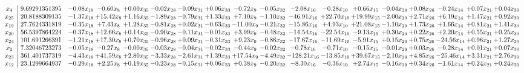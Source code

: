 \documentclass[9pt]{article}
\begin{document}
 \[\begin{array}{c| c c@{\hskip 2pt} c@{\hskip 2pt} c@{\hskip 2pt} c@{\hskip 2pt} c@{\hskip 2pt} c@{\hskip 2pt} c@{\hskip 2pt} c@{\hskip 2pt} c@{\hskip 2pt} c@{\hskip 2pt} c@{\hskip 2pt} c@{\hskip 2pt} c@{\hskip 2pt} c@{\hskip 2pt} c@{\hskip 2pt} c@{\hskip 2pt} }
 x_{4}   &  9.69291351395 & -0.08 x_{18} & -0.60 x_{8} & +  0.00 x_{35} & -0.02 x_{28} & -0.09 x_{31} & +  0.06 x_{33} & -0.72 x_{9} & -0.05 x_{32} & -2.08 x_{16} & -0.28 x_{10} & +  0.66 x_{15} & -0.04 x_{29} & +  0.08 x_{26} & -0.24 x_{14} & +  0.07 x_{21} & +  0.04 x_{30}\\
 x_{25}   &  20.8188309135 & -1.37 x_{18} & + 15.42 x_{8} & +  1.16 x_{35} & -1.89 x_{28} & -0.79 x_{31} & +  1.33 x_{33} & +  7.10 x_{9} & -1.10 x_{32} & -46.91 x_{16} & + 22.70 x_{10} & + 19.99 x_{15} & -2.00 x_{29} & +  2.71 x_{26} & +  6.19 x_{14} & +  1.47 x_{21} & +  0.92 x_{30}\\
 x_{19}   &  27.7624331819 & -0.35 x_{18} & +  7.43 x_{8} & +  1.28 x_{35} & -0.81 x_{28} & +  0.02 x_{31} & -0.63 x_{33} & -11.00 x_{9} & -0.21 x_{32} & -15.86 x_{16} & +  4.93 x_{10} & + 21.08 x_{15} & -1.10 x_{29} & +  1.73 x_{26} & +  1.66 x_{14} & +  0.81 x_{21} & +  1.41 x_{30}\\
 x_{20}   &  56.5397864224 & -0.37 x_{18} & + 12.66 x_{8} & +  0.14 x_{35} & -0.90 x_{28} & -0.11 x_{31} & -0.01 x_{33} & +  3.99 x_{9} & -0.48 x_{32} & -14.54 x_{16} & -22.54 x_{10} & -9.13 x_{15} & +  0.30 x_{29} & +  0.22 x_{26} & +  2.20 x_{14} & +  0.55 x_{21} & +  0.25 x_{30}\\
 x_{24}   &  101.691266391 & -1.21 x_{18} & + 17.30 x_{8} & +  0.70 x_{35} & -0.96 x_{28} & +  0.09 x_{31} & -0.31 x_{33} & +  9.23 x_{9} & -0.86 x_{32} & -17.67 x_{16} & -11.69 x_{10} & -5.91 x_{15} & +  0.15 x_{29} & +  0.75 x_{26} & -24.56 x_{14} & +  0.96 x_{21} & +  1.27 x_{30}\\
 x_{2}   &  7.32046723273 & -0.05 x_{18} & -0.27 x_{8} & -0.00 x_{35} & -0.03 x_{28} & -0.04 x_{31} & -0.02 x_{33} & -0.44 x_{9} & -0.02 x_{32} & -0.78 x_{16} & -0.71 x_{10} & -0.15 x_{15} & -0.01 x_{29} & +  0.03 x_{26} & -0.28 x_{14} & +  0.01 x_{21} & +  0.07 x_{30}\\
 x_{23}   &  361.401737319 & -4.43 x_{18} & + 41.59 x_{8} & +  2.80 x_{35} & -3.33 x_{28} & -2.61 x_{31} & +  1.39 x_{33} & + 17.54 x_{9} & -4.49 x_{32} & -128.21 x_{16} & -13.85 x_{10} & + 39.67 x_{15} & -2.10 x_{29} & +  4.85 x_{26} & -25.46 x_{14} & +  3.31 x_{21} & +  2.76 x_{30}\\
 x_{12}   &  23.1299664937 & -0.29 x_{18} & +  2.25 x_{8} & +  0.19 x_{35} & -0.23 x_{28} & -0.15 x_{31} & +  0.06 x_{33} & +  0.38 x_{9} & -0.20 x_{32} & -8.30 x_{16} & -0.36 x_{10} & +  2.74 x_{15} & -0.16 x_{29} & +  0.34 x_{26} & -1.61 x_{14} & +  0.24 x_{21} & +  0.24 x_{30}\\

\end{array}\]
\end{document}
